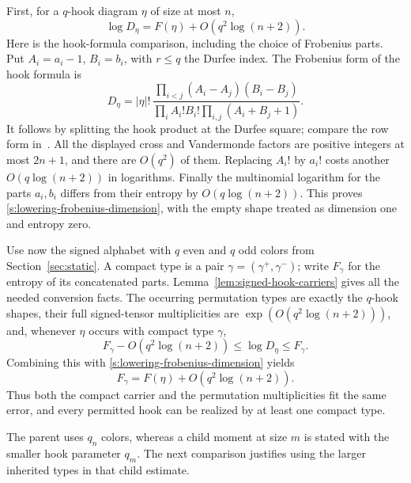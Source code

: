 First, for a $q$-hook diagram $\eta$ of size at most $n$,
\begin{equation}\label{s:lowering-frobenius-dimension}
 \log D_\eta=F(\eta)+O(q^2\log(n+2)).
\end{equation}
Here is the hook-formula comparison, including the choice of Frobenius
parts. Put $A_i=a_i-1$, $B_i=b_i$, with $r\le q$ the Durfee index.
The Frobenius form of the hook formula is
\[
 D_\eta=|\eta|!\,
 \frac{\prod_{i<j}(A_i-A_j)(B_i-B_j)}
      {\prod_i A_i!B_i!\prod_{i,j}(A_i+B_j+1)}.
\]
It follows by splitting the hook product at the Durfee square;
compare the row form in~\cite[\S4.17, formula (5) and Theorem 4.53]{etingof}.
All the displayed cross and Vandermonde factors are positive integers
at most $2n+1$, and there are $O(q^2)$ of them. Replacing $A_i!$
by $a_i!$ costs another $O(q\log(n+2))$ in logarithms. Finally the
multinomial logarithm for the parts $a_i,b_i$ differs from their
entropy by $O(q\log(n+2))$. This proves
\eqref{s:lowering-frobenius-dimension}, with the empty shape treated
as dimension one and entropy zero.

Use now the signed alphabet with $q$ even and $q$ odd colors from
Section~\ref{sec:static}. A compact type is a pair
$\gamma=(\gamma^+,\gamma^-)$; write $F_\gamma$ for the entropy of
its concatenated parts. Lemma~\ref{lem:signed-hook-carriers} gives
all the needed conversion facts. The occurring permutation types are
exactly the $q$-hook shapes, their full signed-tensor multiplicities
are $\exp(O(q^2\log(n+2)))$, and, whenever $\eta$ occurs with
compact type $\gamma$,
\[
 F_\gamma-O(q^2\log(n+2))\le\log D_\eta\le F_\gamma.
\]
Combining this with \eqref{s:lowering-frobenius-dimension} yields
\[
 F_\gamma=F(\eta)+O(q^2\log(n+2)).
\]
Thus both the compact carrier and the permutation multiplicities
fit the same error, and every permitted hook can be realized by
at least one compact type.


The parent uses $q_n$ colors, whereas a child moment at size $m$
is stated with the smaller hook parameter $q_m$. The next comparison
justifies using the larger inherited types in that child estimate.

